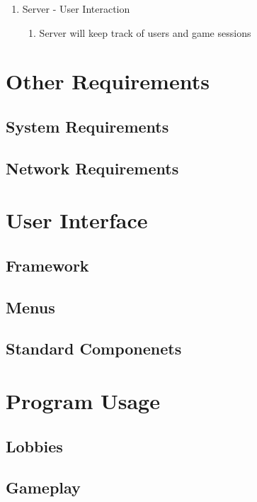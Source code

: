 \documentclass{scrreprt}
\begin{document}
\begin{enumerate}[resume*]

  \item Server - User Interaction
  \begin{enumerate}[label*=\arabic*.]
  	\item Server will keep track of users and game sessions
  \end{enumerate}

\end{enumerate}

\chapter{Other Requirements}

\section{System Requirements}

\section{Network Requirements}

\chapter{User Interface}

\section{Framework}

\section{Menus}

\section{Standard Componenets}

\chapter{Program Usage}

\section{Lobbies}

\section{Gameplay}
\end{document}

